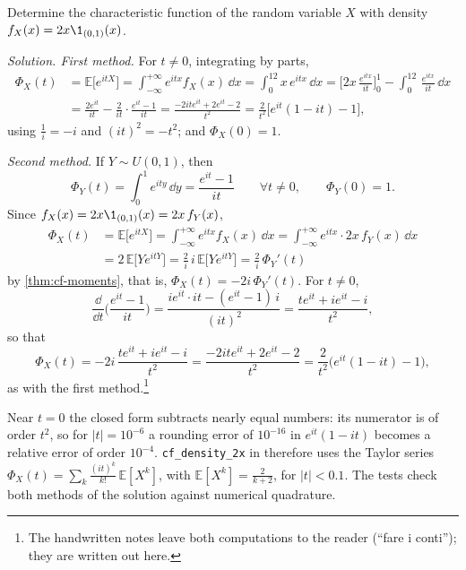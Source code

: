 \begin{example}\label{exa:cf-density-2x}
Determine the characteristic function of the random variable $X$ with density
$f_X(x)=2x\1_{(0,1)}(x)$.

\emph{Solution. First method.} For $t\ne0$, integrating by parts,
\[
\begin{aligned}
  \Phi_X(t)&=\mathbb E\big[e^{itX}\big]=\int_{-\infty}^{+\infty}e^{itx}f_X(x)\,\dd x
  =\int_0^12x\,e^{itx}\,\dd x
  =\Big[2x\,\frac{e^{itx}}{it}\Big]_0^1-\int_0^12\,\frac{e^{itx}}{it}\,\dd x\\
  &=\frac{2e^{it}}{it}-\frac2{it}\cdot\frac{e^{it}-1}{it}
  =\frac{-2ite^{it}+2e^{it}-2}{t^2}
  =\frac2{t^2}\big[e^{it}(1-it)-1\big],
\end{aligned}
\]
using $\frac1i=-i$ and $(it)^2=-t^2$; and $\Phi_X(0)=1$.

\emph{Second method.} If $Y\sim U(0,1)$, then
\[
  \Phi_Y(t)=\int_0^1e^{ity}\,\dd y=\frac{e^{it}-1}{it}\qquad\forall t\ne0,\qquad\Phi_Y(0)=1 .
\]
Since $f_X(x)=2x\1_{(0,1)}(x)=2x\,f_Y(x)$,
\[
\begin{aligned}
  \Phi_X(t)&=\mathbb E\big[e^{itX}\big]=\int_{-\infty}^{+\infty}e^{itx}f_X(x)\,\dd x
  =\int_{-\infty}^{+\infty}e^{itx}\cdot2x\,f_Y(x)\,\dd x\\
  &=2\,\mathbb E\big[Ye^{itY}\big]=\frac2i\,i\,\mathbb E\big[Ye^{itY}\big]=\frac2i\,\Phi_Y'(t)
\end{aligned}
\]
by \cref{thm:cf-moments}, that is, $\Phi_X(t)=-2i\,\Phi_Y'(t)$. For $t\ne0$,
\[
  \frac{\dd}{\dd t}\Big(\frac{e^{it}-1}{it}\Big)=\frac{ie^{it}\cdot it-(e^{it}-1)\,i}{(it)^2}
  =\frac{te^{it}+ie^{it}-i}{t^2},
\]
so that
\[
  \Phi_X(t)=-2i\,\frac{te^{it}+ie^{it}-i}{t^2}=\frac{-2ite^{it}+2e^{it}-2}{t^2}
  =\frac2{t^2}\big(e^{it}(1-it)-1\big),
\]
as with the first method.\footnote{The handwritten notes leave both computations to the reader
(``fare i conti''); they are written out here.}
\end{example}

\begin{remark}[computational]\label{rem:cf-code-2x}
Near $t=0$ the closed form subtracts nearly equal numbers: its numerator is of order $t^2$, so
for $|t|=10^{-6}$ a rounding error of $10^{-16}$ in $e^{it}(1-it)$ becomes a relative error of
order $10^{-4}$. \texttt{cf\_density\_2x} in  therefore
uses the Taylor series $\Phi_X(t)=\sum_k\frac{(it)^k}{k!}\,\mathbb E[X^k]$, with
$\mathbb E[X^k]=\frac2{k+2}$, for $|t|<0.1$. The tests check both methods of the solution against
numerical quadrature.
\end{remark}

